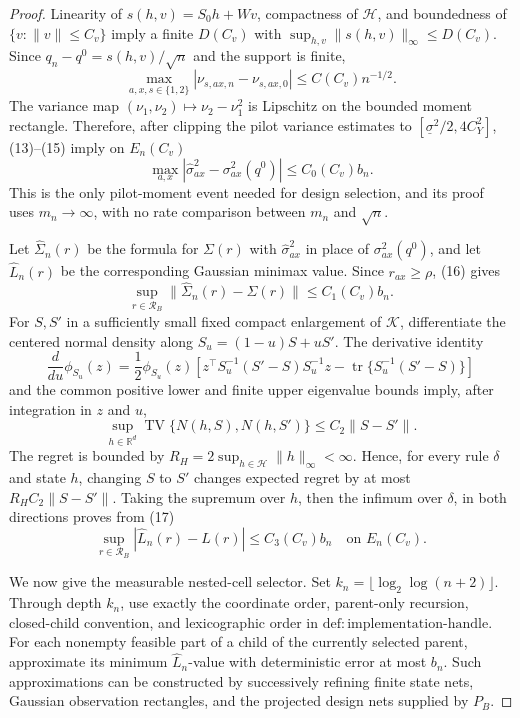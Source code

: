 \documentclass{article}
\begin{document}
\begin{proof}
Linearity of \(s(h,v)=S_0h+Wv\), compactness of \(\mathcal H\), and boundedness of \(\{v:\lVert v\rVert\le C_v\}\) imply a finite \(D(C_v)\) with \(\sup_{h,v}\lVert s(h,v)\rVert_\infty\le D(C_v)\). Since \(q_n-q^0=s(h,v)/\sqrt n\) and the support is finite,
\[
\max_{a,x,s\in\{1,2\}}|\nu_{s,ax,n}-\nu_{s,ax,0}|
\le C(C_v)n^{-1/2}.
\tag{15}
\]
The variance map \((\nu_1,\nu_2)\mapsto\nu_2-\nu_1^2\) is Lipschitz on the bounded moment rectangle. Therefore, after clipping the pilot variance estimates to \([\underline\sigma^2/2,4C_Y^2]\), (13)--(15) imply on \(E_n(C_v)\)
\[
\max_{a,x}|\widehat\sigma^2_{ax}-\sigma^2_{ax}(q^0)|
\le C_0(C_v)b_n.
\tag{16}
\]
This is the only pilot-moment event needed for design selection, and its proof uses \(m_n\to\infty\), with no rate comparison between \(m_n\) and \(\sqrt n\).

Let \(\widehat\Sigma_n(r)\) be the formula for \(\Sigma(r)\) with \(\widehat\sigma^2_{ax}\) in place of \(\sigma^2_{ax}(q^0)\), and let \(\widehat L_n(r)\) be the corresponding Gaussian minimax value. Since \(r_{ax}\ge\rho\), (16) gives
\[
\sup_{r\in\mathcal R_B}\lVert\widehat\Sigma_n(r)-\Sigma(r)\rVert
\le C_1(C_v)b_n.
\tag{17}
\]
For \(S,S'\) in a sufficiently small fixed compact enlargement of \(\mathcal K\), differentiate the centered normal density along \(S_u=(1-u)S+uS'\). The derivative identity
\[
\frac{d}{du}\phi_{S_u}(z)
=\frac12\phi_{S_u}(z)
\left[z^\top S_u^{-1}(S'-S)S_u^{-1}z
-\operatorname{tr}\{S_u^{-1}(S'-S)\}\right]
\]
and the common positive lower and finite upper eigenvalue bounds imply, after integration in \(z\) and \(u\),
\[
\sup_{h\in\mathbb R^d}
\operatorname{TV}\{N(h,S),N(h,S')\}
\le C_2\lVert S-S'\rVert.
\]
The regret is bounded by \(R_H=2\sup_{h\in\mathcal H}\lVert h\rVert_\infty<\infty\). Hence, for every rule \(\delta\) and state \(h\), changing \(S\) to \(S'\) changes expected regret by at most \(R_HC_2\lVert S-S'\rVert\). Taking the supremum over \(h\), then the infimum over \(\delta\), in both directions proves from (17)
\[
\sup_{r\in\mathcal R_B}|\widehat L_n(r)-L(r)|
\le C_3(C_v)b_n
\quad\text{on }E_n(C_v).
\tag{18}
\]

We now give the measurable nested-cell selector. Set \(k_n=\lfloor\log_2\log(n+2)\rfloor\). Through depth \(k_n\), use exactly the coordinate order, parent-only recursion, closed-child convention, and lexicographic order in \(\mathrm{def:implementation\text{-}handle}\). For each nonempty feasible part of a child of the currently selected parent, approximate its minimum \(\widehat L_n\)-value with deterministic error at most \(b_n\). Such approximations can be constructed by successively refining finite state nets, Gaussian observation rectangles, and the projected design nets supplied by \(P_B\).


\end{proof}
\end{document}
